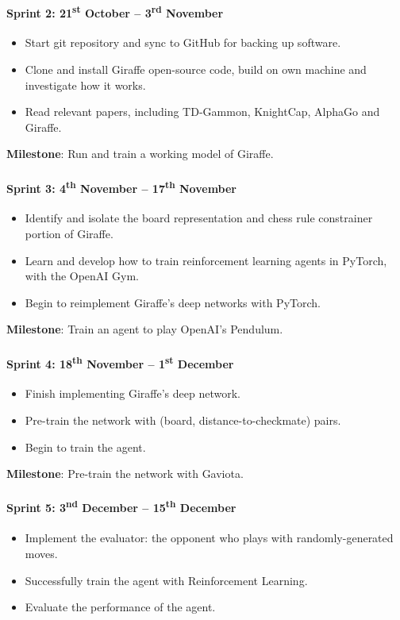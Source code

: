 \documentclass[a4paper]{article}
\begin{document}
\paragraph{Sprint 2: 21\textsuperscript{st} October -- 3\textsuperscript{rd} November}
\begin{itemize}
\item Start git repository and sync to GitHub for backing up software.
\item Clone and install Giraffe open-source code, build on own machine and investigate how it works.
\item Read relevant papers, including TD-Gammon, KnightCap, AlphaGo and Giraffe. 
\end{itemize}

\textbf{Milestone}: Run and train a working model of Giraffe.

\paragraph{Sprint 3: 4\textsuperscript{th} November -- 17\textsuperscript{th} November}
\begin{itemize}
\item Identify and isolate the board representation and chess rule constrainer portion of Giraffe.
\item Learn and develop how to train reinforcement learning agents in PyTorch, with the OpenAI Gym.
\item Begin to reimplement Giraffe's deep networks with PyTorch.
\end{itemize}

\textbf{Milestone}: Train an agent to play OpenAI's Pendulum.

\paragraph{Sprint 4: 18\textsuperscript{th} November -- 1\textsuperscript{st} December}
\begin{itemize}
\item Finish implementing Giraffe's deep network.
\item Pre-train the network with (board, distance-to-checkmate) pairs.
\item Begin to train the agent.
\end{itemize}

\textbf{Milestone}: Pre-train the network with Gaviota.

\paragraph{Sprint 5: 3\textsuperscript{nd} December -- 15\textsuperscript{th} December}
\begin{itemize}
\item Implement the evaluator: the opponent who plays with randomly-generated moves.
\item Successfully train the agent with Reinforcement Learning.
\item Evaluate the performance of the agent.
\end{itemize}
\end{document}
